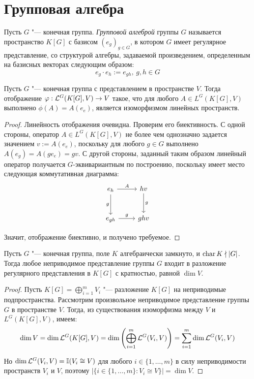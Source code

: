 \section{Групповая алгебра}

\begin{definition}
	Пусть $G$ "--- конечная группа. \textit{Групповой алгеброй} группы $G$ называется пространство $K[G]$ с базисом $(e_g)_{g \in G}$, в котором $G$ имеет регулярное представление, со структурой алгебры, задаваемой произведением, определенным на базисных векторах следующим образом:
	\[e_g \cdot e_h := e_{gh},~g, h \in G\]
\end{definition}

\begin{proposition}
	Пусть $G$ "--- конечная группа с представлением в пространстве $V$. Тогда отображение $\varphi: \mathcal L^G(K[G], V) \to V$ такое, что для любого $A \in L^G(K[G], V)$ выполнено $\phi(A) = A(e_e)$, является изоморфизмом линейных пространств.
\end{proposition}

\begin{proof}
	Линейность отображения очевидна. Проверим его биективность. С одной стороны, оператор $A \in L^G(K[G], V)$ не \pagebreak более чем однозначно задается значением $v := A(e_e)$, поскольку для любого $g \in G$ выполнено $A(e_g) = A(ge_e) = gv$. С другой стороны, заданный таким образом линейный оператор получается $G$-эквивариантным по построению, поскольку имеет место следующая коммутативная диаграмма:
	\[
	\begin{tikzcd}[row sep = large]
		e_h \arrow[swap]{d}{g} \arrow{r}{A} & hv \arrow{d}{g}\\
		e_{gh} \arrow{r}{g} & ghv
	\end{tikzcd}
	\]
	
	Значит, отображение биективно, и получено требуемое.
\end{proof}

\begin{corollary}
	Пусть $G$ "--- конечная группа, поле $K$ алгебраически замкнуто, и $\operatorname{char}{K} \nmid |G|$. Тогда любое неприводимое представление группы $G$ входит в разложение регулярного представления в $K[G]$ с кратностью, равной $\dim{V}$.
\end{corollary}

\begin{proof}
	Пусть $K[G] = \bigoplus_{i = 1}^m V_i$ "--- разложение $K[G]$ на неприводимые подпространства. Рассмотрим произвольное неприводимое представление группы $G$ в пространстве $V$. Тогда, из существования изоморфизма между $V$ и $L^G(K[G], V)$, имеем:
	\[\dim{V} = \dim\mathcal L^G(K[G], V) = \dim \left(\bigoplus_{i = 1}^m\mathcal L^G(V_i, V)\right) = \sum_{i = 1}^m\dim\mathcal L^G(V_i, V)\]
	
	Но $\dim\mathcal L^G(V_i, V) = \mathbb I(V_i \cong V)$ для любого $i \in \{1, \dotsc, m\}$ в силу неприводимости пространств $V_i$ и $V$, поэтому $|\{i \in \{1, \dotsc, m\}: V_i \cong V\}| = \dim{V}$.
\end{proof}

